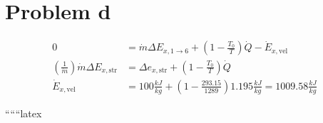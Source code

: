 \section*{Problem d}


\begin{align*}
0 &= \dot{m} \Delta E_{x,1\rightarrow 6} + \left( 1 - \frac{T_0}{T} \right) \dot{Q} - \dot{E}_{x,\text{vel}} \\
\left( \frac{1}{\dot{m}} \right) \dot{m} \Delta E_{x,\text{str}} &= \Delta e_{x,\text{str}} + \left( 1 - \frac{T_0}{T} \right) \dot{Q} \\
\dot{E}_{x,\text{vel}} &= 100 \frac{kJ}{kg} + \left( 1 - \frac{293.15}{1289} \right) 1.195 \frac{kJ}{kg} = 1009.58 \frac{kJ}{kg}
\end{align*}


``````latex